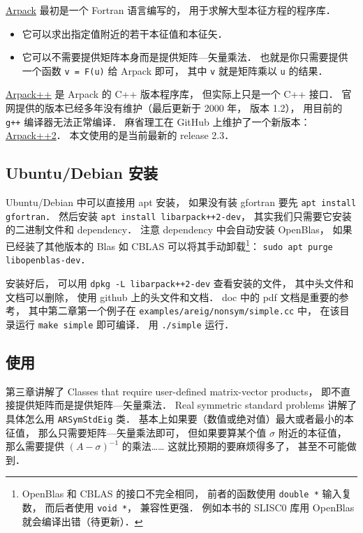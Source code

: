
\begin{issues}
\issueDraft
\end{issues}


\href{https://www.caam.rice.edu/software/ARPACK/}{Arpack} 最初是一个 Fortran 语言编写的， 用于求解大型本征方程的程序库．
\begin{itemize}
\item 它可以求出指定值附近的若干本征值和本征矢．
\item 它可以不需要提供矩阵本身而是提供矩阵—矢量乘法． 也就是你只需要提供一个函数 \verb|v = F(u)| 给 Arpack 即可， 其中 \verb|v| 就是矩阵乘以 \verb|u| 的结果．
\end{itemize}

\href{http://www.ime.unicamp.br/~chico/arpack++/}{Arpack++} 是 Arpack 的 C++ 版本程序库， 但实际上只是一个 C++ 接口． 官网提供的版本已经多年没有维护（最后更新于 2000 年， 版本 1.2）， 用目前的 \verb|g++| 编译器无法正常编译． 麻省理工在 GitHub 上维护了一个新版本： \href{https://github.com/m-reuter/arpackpp}{Arpack++2}． 本文使用的是当前最新的 release 2.3．

\subsection{Ubuntu/Debian 安装}
Ubuntu/Debian 中可以直接用 apt 安装， 如果没有装 gfortran 要先 \verb|apt install gfortran|． 然后安装 \verb|apt install libarpack++2-dev|， 其实我们只需要它安装的二进制文件和 dependency． 注意 dependency 中会自动安装 OpenBlas， 如果已经装了其他版本的 Blas 如 CBLAS 可以将其手动卸载\footnote{OpenBlas 和 CBLAS 的接口不完全相同， 前者的函数使用 \lstinline|double *| 输入复数， 而后者使用 \verb|void *|， 兼容性更强． 例如本书的 SLISC0 库用 OpenBlas 就会编译出错（待更新）．}： \verb|sudo apt purge libopenblas-dev|．

安装好后， 可以用 \verb|dpkg -L libarpack++2-dev| 查看安装的文件， 其中头文件和文档可以删除， 使用 github 上的头文件和文档． doc 中的 pdf 文档是重要的参考， 其中第二章第一个例子在 \verb|examples/areig/nonsym/simple.cc| 中， 在该目录运行 \verb|make simple| 即可编译． 用 \verb|./simple| 运行．

\subsection{使用}
第三章讲解了 Classes that require user-defined matrix-vector products， 即不直接提供矩阵而是提供矩阵—矢量乘法． Real symmetric standard problems 讲解了具体怎么用 \verb|ARSymStdEig| 类． 基本上如果要（数值或绝对值）最大或者最小的本征值， 那么只需要矩阵—矢量乘法即可， 但如果要算某个值 $\sigma$ 附近的本征值， 那么需要提供 $(A - \sigma)^{-1}$ 的乘法…… 这就比预期的要麻烦得多了， 甚至不可能做到．

